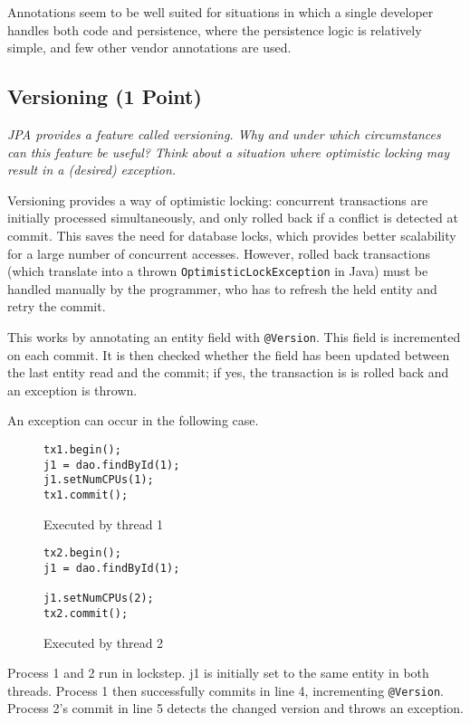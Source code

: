 \documentclass[a4paper,10pt]{article}
\begin{document}
Annotations seem to be well suited for situations in which a single developer handles
both code and persistence, where the persistence logic is relatively simple,
and few other vendor annotations are used.

\subsection{Versioning (1 Point)}

\emph{JPA provides a feature called versioning. Why and under which circumstances can this feature be useful?
Think about a situation where optimistic locking may result in a (desired) exception.}

\vspace{3mm}

Versioning provides a way of optimistic locking: concurrent transactions are initially processed
simultaneously, and only rolled back if a conflict is detected at commit. This saves the need for 
database locks, which provides better scalability for a large number of concurrent accesses.
However, rolled back transactions (which translate into a thrown \lstinline|OptimisticLockException|
in Java) must be handled manually by the programmer, who has to refresh the held entity and
retry the commit.

This works by annotating an entity field with \lstinline|@Version|. This field
is incremented on each commit. It is then checked whether the field has been updated
between the last entity read and the commit; if yes, the transaction is is rolled back and
an exception is thrown.

An exception can occur in the following case.

\begin{figure}[hl]
\begin{lstlisting}
tx1.begin();
j1 = dao.findById(1);
j1.setNumCPUs(1);
tx1.commit();
\end{lstlisting}
\caption{Executed by thread 1}
\end{figure}

\begin{figure}[hl]
\begin{lstlisting}
tx2.begin();
j1 = dao.findById(1);

j1.setNumCPUs(2);
tx2.commit();
\end{lstlisting}
\caption{Executed by thread 2}
\end{figure}

Process 1 and 2 run in lockstep. j1 is initially set to the same entity in both threads.
Process 1 then successfully commits in line 4, incrementing \lstinline|@Version|.
Process 2's commit in line 5 detects the changed version and throws an exception.
\end{document}
